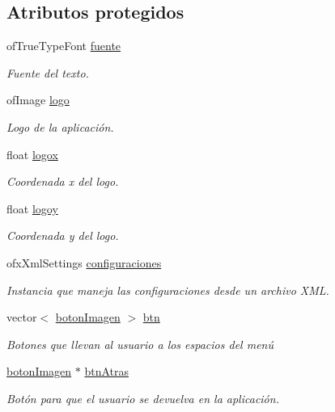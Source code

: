 \subsection*{Atributos protegidos}
\begin{DoxyCompactItemize}
\item 
of\+True\+Type\+Font \hyperlink{classmenu_base_a8c48cc67dd9d789cf5a06c61333c8db9}{fuente}
\begin{DoxyCompactList}\small\item\em Fuente del texto. \end{DoxyCompactList}\item 
of\+Image \hyperlink{classmenu_base_a817536aa29cfe8f13d1e7c745e45b31d}{logo}
\begin{DoxyCompactList}\small\item\em Logo de la aplicación. \end{DoxyCompactList}\item 
float \hyperlink{classmenu_base_a97f2f1c174cadb12ae7b62f672fcde97}{logox}
\begin{DoxyCompactList}\small\item\em Coordenada x del logo. \end{DoxyCompactList}\item 
float \hyperlink{classmenu_base_a8bd56c156201d813c9c6da884cd98296}{logoy}
\begin{DoxyCompactList}\small\item\em Coordenada y del logo. \end{DoxyCompactList}\item 
ofx\+Xml\+Settings \hyperlink{classmenu_base_a07ca6fd4669759542b11d31eada55403}{configuraciones}
\begin{DoxyCompactList}\small\item\em Instancia que maneja las configuraciones desde un archivo X\+M\+L. \end{DoxyCompactList}\item 
vector$<$ \hyperlink{classboton_imagen}{boton\+Imagen} $>$ \hyperlink{classmenu_base_a6de979e3389d5918db62c75d886161d9}{btn}
\begin{DoxyCompactList}\small\item\em Botones que llevan al usuario a los espacios del menú \end{DoxyCompactList}\item 
\hyperlink{classboton_imagen}{boton\+Imagen} $\ast$ \hyperlink{classmenu_base_a28cf020839a96b7793388baf8a9e054d}{btn\+Atras}
\begin{DoxyCompactList}\small\item\em Botón para que el usuario se devuelva en la aplicación. \end{DoxyCompactList}\end{DoxyCompactItemize}


